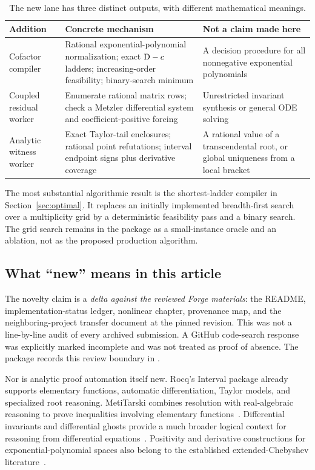 \begin{table}[ht]
\centering\small
\begin{tabularx}{\textwidth}{@{}p{}XX@{}}
\toprule
Addition & Concrete mechanism & Not a claim made here\\
\midrule
Cofactor compiler & Rational exponential-polynomial normalization; exact $\mathrm D-c$ ladders; increasing-order feasibility; binary-search minimum & A decision procedure for all nonnegative exponential polynomials\\
Coupled residual worker & Enumerate rational matrix rows; check a Metzler differential system and coefficient-positive forcing & Unrestricted invariant synthesis or general ODE solving\\
Analytic witness worker & Exact Taylor-tail enclosures; rational point refutations; interval endpoint signs plus derivative coverage & A rational value of a transcendental root, or global uniqueness from a local bracket\\
\bottomrule
\end{tabularx}
\caption{The new lane has three distinct outputs, with different mathematical meanings.}
\end{table}

The most substantial algorithmic result is the shortest-ladder compiler in Section~\ref{sec:optimal}. It replaces an initially implemented breadth-first search over a multiplicity grid by a deterministic feasibility pass and a binary search. The grid search remains in the package as a small-instance oracle and an ablation, not as the proposed production algorithm.

\subsection{What ``new'' means in this article}

The novelty claim is a \emph{delta against the reviewed Forge materials}: the README, implementation-status ledger, nonlinear chapter, provenance map, and the neighboring-project transfer document at the pinned revision. This was not a line-by-line audit of every archived submission. A GitHub code-search response was explicitly marked incomplete and was not treated as proof of absence. The package records this review boundary in .

Nor is analytic proof automation itself new. Rocq's Interval package already supports elementary functions, automatic differentiation, Taylor models, and specialized root reasoning. MetiTarski combines resolution with real-algebraic reasoning to prove inequalities involving elementary functions~\cite{interval,metitarski}. Differential invariants and differential ghosts provide a much broader logical context for reasoning from differential equations~\cite{platzer-tan}. Positivity and derivative constructions for exponential-polynomial spaces also belong to the established extended-Chebyshev literature~\cite{aldaz}.

